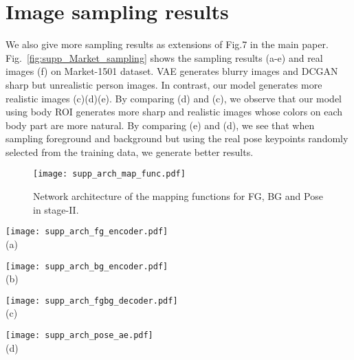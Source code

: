 \documentclass[10pt,twocolumn,letterpaper]{article}
\begin{document}
\section{Image sampling results}
\label{sec:supp_sampling}

We also give more sampling results as extensions of Fig.7 in the main paper. Fig.~\ref{fig:supp_Market_sampling} shows the sampling results (a-e) and real images (f) on Market-1501 dataset.
VAE generates blurry images and DCGAN sharp but unrealistic person images. In contrast, our model generates more realistic images (c)(d)(e). By comparing (d) and (c), we observe that our model using body ROI generates more sharp and realistic images whose colors on each body part are more natural. By comparing (e) and (d), we see that when sampling foreground and background but using the real pose keypoints randomly selected from the training data, we generate better results. 


\begin{figure} [htp]
\scriptsize
\centering
  \texttt{[image: supp\_arch\_map\_func.pdf]}
\caption{Network architecture of the mapping functions for FG, BG and Pose in stage-\RN{2}.
}
\label{fig:supp_arch_stag2}
\end{figure}

\begin{figure*} [htp]
\scriptsize
\centering
\begin{minipage}{0.49\textwidth}
  \centering
  \texttt{[image: supp\_arch\_fg\_encoder.pdf]}\\
(a)
\end{minipage}
\hfill
\begin{minipage}{0.49\textwidth}
  \centering
  \texttt{[image: supp\_arch\_bg\_encoder.pdf]}\\
(b)
\end{minipage}
\hfill
\begin{minipage}{0.99\textwidth}
  \centering
  \texttt{[image: supp\_arch\_fgbg\_decoder.pdf]}\\
(c)
\end{minipage}
\hfill
\begin{minipage}{0.99\textwidth}
  \centering
  \texttt{[image: supp\_arch\_pose\_ae.pdf]}\\
(d)
\end{minipage}
\caption{Network architectures of stage-\RN{1}. (a) FG encoder, fed with the extracted 7 FG body ROI feature maps and outputting 7 FG embedding features of 32-dim after 5 convolutional residual blocks.
(b) BG encoder, fed with the BG feature maps and outputting a BG embedding feature of 128-dim after 5 convolutional residual blocks.
(c) FG and BG decoder, fed with the concatenated appearance and pose feature maps and outputting the generated image after the ``U-net''-based~\cite{U-net} architecture.
(d) Pose auto-encoder, fed with the concatenated keypoint coordinates and visibility vector and outputting the reconstructed vector after the auto-encoder.
}
\label{fig:supp_arch_stag1}
\end{figure*}
\end{document}
